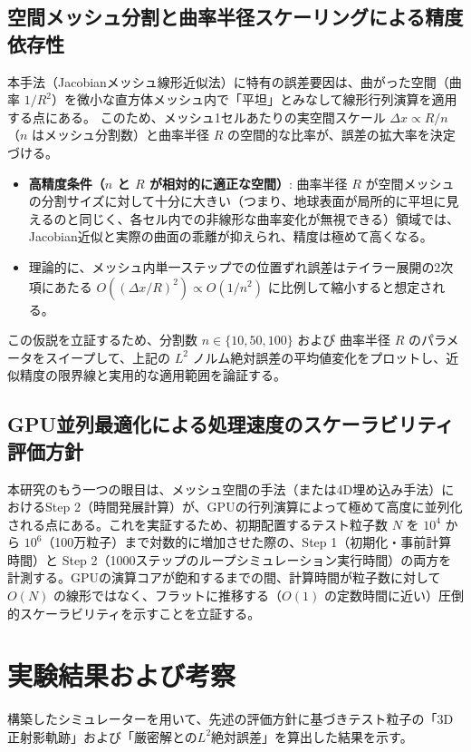 \documentclass[11pt]{ltjsarticle}
\begin{document}
\subsection{空間メッシュ分割と曲率半径スケーリングによる精度依存性}
本手法（Jacobianメッシュ線形近似法）に特有の誤差要因は、曲がった空間（曲率 $1/R^2$）を微小な直方体メッシュ内で「平坦」とみなして線形行列演算を適用する点にある。
このため、メッシュ1セルあたりの実空間スケール $\Delta x \propto R / n$ （$n$ はメッシュ分割数）と曲率半径 $R$ の空間的な比率が、誤差の拡大率を決定づける。

\begin{itemize}
\item \textbf{高精度条件（$n$ と $R$ が相対的に適正な空間）}: 曲率半径 $R$ が空間メッシュの分割サイズに対して十分に大きい（つまり、地球表面が局所的に平坦に見えるのと同じく、各セル内での非線形な曲率変化が無視できる）領域では、Jacobian近似と実際の曲面の乖離が抑えられ、精度は極めて高くなる。
\item 理論的に、メッシュ内単一ステップでの位置ずれ誤差はテイラー展開の2次項にあたる $O((\Delta x / R)^2) \propto O(1/n^2)$ に比例して縮小すると想定される。
\end{itemize}

この仮説を立証するため、分割数 $n \in \{10, 50, 100\}$ および 曲率半径 $R$ のパラメータをスイープして、上記の $L^2$ ノルム絶対誤差の平均値変化をプロットし、近似精度の限界線と実用的な適用範囲を論証する。

\subsection{GPU並列最適化による処理速度のスケーラビリティ評価方針}
本研究のもう一つの眼目は、メッシュ空間の手法（または4D埋め込み手法）におけるStep 2（時間発展計算）が、GPUの行列演算によって極めて高度に並列化される点にある。これを実証するため、初期配置するテスト粒子数 $N$ を $10^4$ から $10^6$（100万粒子）まで対数的に増加させた際の、Step 1（初期化・事前計算時間）と Step 2（1000ステップのループシミュレーション実行時間）の両方を計測する。GPUの演算コアが飽和するまでの間、計算時間が粒子数に対して $O(N)$ の線形ではなく、フラットに推移する（$O(1)$ の定数時間に近い）圧倒的スケーラビリティを示すことを立証する。

\section{実験結果および考察}
構築したシミュレーターを用いて、先述の評価方針に基づきテスト粒子の「3D正射影軌跡」および「厳密解との$L^2$絶対誤差」を算出した結果を示す。
\end{document}
